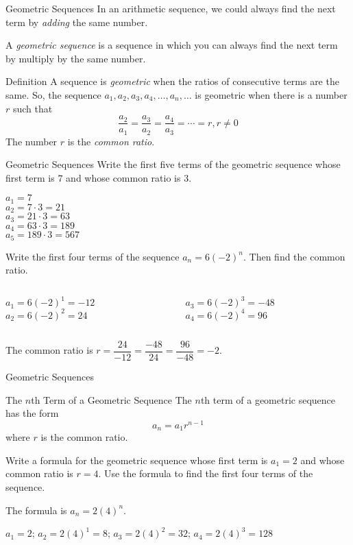 \documentclass[t]{beamer}
\begin{document}
	\begin{frame}{Geometric Sequences}
		In an arithmetic sequence, we could always find the next term by \textit{adding} the same number. \pause
		
		A \textit{geometric sequence} is a sequence in which you can always find the next term by multiply by the same number. \pause
		
		\begin{block}{Definition}
			A sequence is \textit{geometric} when the ratios of consecutive terms are the same. So, the sequence $a_1, a_2, a_3, a_4, \dots, a_n, \dots$ is geometric when there is a number $r$ such that $$\dfrac{a_2}{a_1} = \dfrac{a_3}{a_2} = \dfrac{a_4}{a_3} = \cdots = r, r \neq 0$$ The number $r$ is the \textit{common ratio}.
		\end{block}
	\end{frame}

	\begin{frame}{Geometric Sequences}
		Write the first five terms of the geometric sequence whose first term is $7$ and whose common ratio is $3$. \pause
		
		$a_1 = 7$ \pause \\
		$a_2 = 7\cdot 3 = 21$ \\ \pause
		$a_3 = 21\cdot 3 = 63$ \\ \pause
		$a_4 = 63\cdot 3 = 189$ \\ \pause
		$a_5 = 189\cdot 3 = 567$ \pause
		
		Write the first four terms of the sequence $a_n = 6(-2)^n$. Then find the common ratio. \pause
		
		\begin{columns}
			\begin{column}{0.5\textwidth}
				$a_1 = 6(-2)^1 = -12$ \\ \pause
				$a_2 = 6(-2)^2 = 24$ \pause
			\end{column}
			\begin{column}{0.5\textwidth}
				$a_3 = 6(-2)^3 = -48$ \\ \pause
				$a_4 = 6(-2)^4 = 96$ \pause
			\end{column}
		\end{columns}
	The common ratio is $r = \dfrac{24}{-12} = \dfrac{-48}{24} = \dfrac{96}{-48} = -2$.
	\end{frame}

	\begin{frame}{Geometric Sequences}
		\begin{block}{The $n$th Term of a Geometric Sequence}
			The $n$th term of a geometric sequence has the form $$a_n = a_1 r^{n-1}$$ where $r$ is the common ratio.
		\end{block} \pause
	
		Write a formula for the geometric sequence whose first term is $a_1 = 2$ and whose common ratio is $r = 4$. Use the formula to find the first four terms of the sequence. \pause
		
		The formula is $a_n = 2(4)^n$. \pause
		
		$a_ 1 = 2$; $a_2 = 2(4)^1 = 8$; $a_3 = 2(4)^2 = 32$; $a_4 = 2(4)^3 = 128$
	\end{frame}
\end{document}
